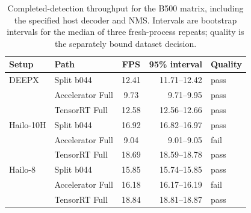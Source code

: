 \begin{table}[htbp]
\centering\small\TableSetup
\caption{Completed-detection throughput for the B500 matrix, including the specified host decoder and NMS. Intervals are bootstrap intervals for the median of three fresh-process repeats; quality is the separately bound dataset decision.}
\label{tab:evaluation:yolov7_standard_native}
\begin{tabularx}{\linewidth}{@{}L{1.55cm}Y S[table-format=2.2]r l@{}}
\toprule
\textbf{Setup} & \textbf{Path} & {\textbf{FPS}} & \textbf{95\% interval} & \textbf{Quality} \\
\midrule
DEEPX & Split b044 & 12.41 & \num{11.71}--\num{12.42} & pass \\
 & Accelerator Full & 9.73 & \num{9.71}--\num{9.95} & pass \\
 & TensorRT Full & 12.58 & \num{12.56}--\num{12.66} & pass \\
\addlinespace[.3em]
Hailo-10H & Split b044 & 16.92 & \num{16.82}--\num{16.97} & pass \\
 & Accelerator Full & 9.04 & \num{9.01}--\num{9.05} & fail \\
 & TensorRT Full & 18.69 & \num{18.59}--\num{18.78} & pass \\
\addlinespace[.3em]
Hailo-8 & Split b044 & 15.85 & \num{15.74}--\num{15.85} & pass \\
 & Accelerator Full & 16.18 & \num{16.17}--\num{16.19} & fail \\
 & TensorRT Full & 18.84 & \num{18.81}--\num{18.87} & pass \\
\bottomrule
\end{tabularx}
\end{table}
